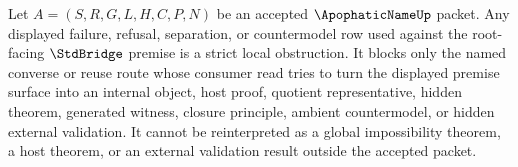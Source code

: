 \begin{corollary}\label{cor:apophatic-name-root-stdbridge-premise-strict-obstruction}
Let $A=(S,R,G,L,H,C,P,N)$ be an accepted $\ApophaticNameUp$ packet. Any displayed failure, refusal, separation, or countermodel row used against the root-facing $\StdBridge$ premise is a strict local obstruction. It blocks only the named converse or reuse route whose consumer read tries to turn the displayed premise surface into an internal object, host proof, quotient representative, hidden theorem, generated witness, closure principle, ambient countermodel, or hidden external validation. It cannot be reinterpreted as a global impossibility theorem, a host theorem, or an external validation result outside the accepted packet.
\end{corollary}
